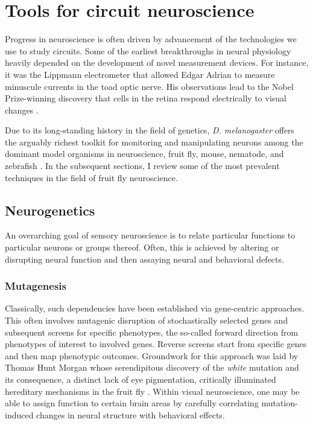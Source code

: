 
\section{Tools for circuit neuroscience}
Progress in neuroscience is often driven by advancement of the technologies we use to study circuits. Some of the earliest breakthroughs in neural physiology heavily depended on the development of novel measurement devices. For instance, it was the Lippmann electrometer that allowed Edgar Adrian to measure minuscule currents in the toad optic nerve. His observations lead to the Nobel Prize-winning discovery that cells in the retina respond electrically to visual changes \citep{Adrian:1928aa}.

Due to its long-standing history in the field of genetics, \textit{D. melanogaster} offers the arguably richest toolkit for monitoring and manipulating neurons among the dominant model organisms in neuroscience, fruit fly, mouse, nematode, and zebrafish \citep{Venken:2011hf}. In the subsequent sections, I review some of the most prevalent techniques in the field of fruit fly neuroscience.

\subsection{Neurogenetics}

An overarching goal of sensory neuroscience is to relate particular functions to particular neurons or groups thereof. Often, this is achieved by altering or disrupting neural function and then assaying neural and behavioral defects.

\subsubsection{Mutagenesis}
Classically, such dependencies have been established via gene-centric approaches. This often involves mutagenic disruption of stochastically selected genes and subsequent screens for specific phenotypes, the so-called forward direction from phenotypes of interest to involved genes. Reverse screens start from specific genes and then map phenotypic outcomes. Groundwork for this approach was laid by Thomas Hunt Morgan whose serendipitous discovery of the \textit{white} mutation and its consequence, a distinct lack of eye pigmentation, critically illuminated hereditary mechanisms in the fruit fly \citep{Morgan:1910aa}. Within visual neuroscience, one may be able to assign function to certain brain areas by carefully correlating mutation-induced changes in neural structure with behavioral effects.


